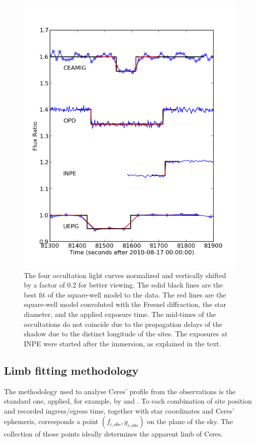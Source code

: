 \documentclass[useAMS,usenatbib]{mn2e}
\begin{document}
\begin{figure}
\includegraphics[scale=0.58]{figures/Ceres_2010_fluxratio.png} 
\caption{The four occultation light curves normalized and vertically shifted by a factor of 0.2 for better viewing. The solid black lines are the best fit of the square-well model to the data. The red lines are the square-well model convoluted with the Fresnel diffraction, the star diameter, and the applied exposure time. The mid-times of the occultations do not coincide due to the propagation delays of the shadow due to the distinct longitude of the sites. The exposures at INPE were started after the immersion, as explained in the text. \label{Fig: Ceres-2010-curves}}
\end{figure}


\subsection{Limb fitting methodology}

The methodology used to analyse Ceres' profile from the observations is the standard one, applied, for example, by \cite{Ortiz2012} and \cite{BragaRibas2013}. To each combination of site position and recorded ingress/egress time, together with star coordinates and Ceres' ephemeris, corresponds a point $(f_{i,obs},g_{i,obs})$ on the plane of the sky. The collection of those points ideally determines the apparent limb of Ceres.
\end{document}
